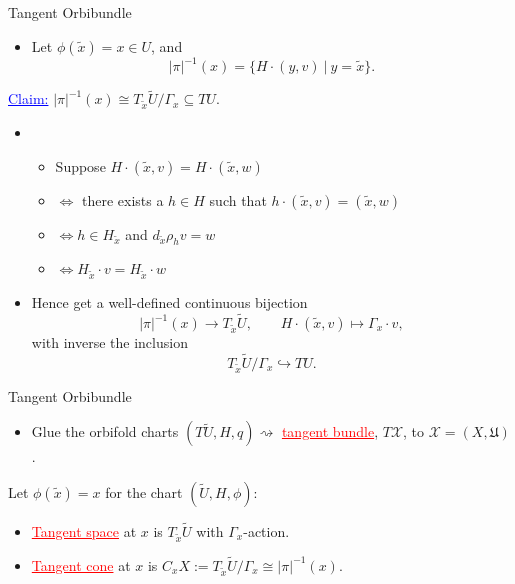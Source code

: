 \documentclass[aspectratio=169,xcolor=dvipsnames]{beamer}
\begin{document}
\begin{frame}{Tangent Orbibundle}
	\begin{itemize}
		\item Let $\phi(\tilde{x}) = x \in U$, and 
		\[
		|\pi|^{-1}(x) = \{ H \cdot (y,v)\ |\ y = \tilde{x} \}.
		\]
	\end{itemize}
	\textcolor{blue}{\underline{Claim:}} $|\pi|^{-1}(x) \cong T_{\tilde{x}}\widetilde{U}/\Gamma_{x} \subseteq TU$.
	\begin{itemize}
		\item
		\begin{itemize}
			\item Suppose $H \cdot (\tilde{x},v) = H \cdot (\tilde{x}, w)$
			\item $\iff$ there exists a $h \in H$ such that $h \cdot (\tilde{x},v) = (\tilde{x},w)$
			\item $\iff h \in H_{\tilde{x}}$ and $d_{\tilde{x}}\rho_{h} v = w$
			\item $\iff H_{\tilde{x}} \cdot v = H_{\tilde{x}} \cdot w$
		\end{itemize}
		\item Hence get a well-defined continuous bijection
		\[
		|\pi|^{-1}(x) \rightarrow T_{\tilde{x}}\widetilde{U}, \qquad H \cdot (\tilde{x}, v) \mapsto \Gamma_{x} \cdot v,
		\]
		with inverse the inclusion
		\[
		T_{\tilde{x}}\widetilde{U}/\Gamma_{x} \hookrightarrow TU.    
		\]
	\end{itemize}
\end{frame}

\begin{frame}{Tangent Orbibundle}
	\begin{itemize}
		\item Glue the orbifold charts $(T\widetilde{U}, H, q) \rightsquigarrow$ \textcolor{red}{\underline{tangent bundle}}, $T\mathcal{X}$, to $\mathcal{X} = (X, \mathfrak{U})$.
	\end{itemize}
	Let $\phi(\tilde{x}) = x$ for the chart $(\widetilde{U}, H, \phi)$:
	\begin{itemize}
		\item \textcolor{red}{\underline{Tangent space}} at $x$ is $T_{\tilde{x}}\widetilde{U}$ with $\Gamma_{x}$-action.
		\item \textcolor{red}{\underline{Tangent cone}} at $x$ is $C_{x}X := T_{\tilde{x}}\widetilde{U}/\Gamma_{x} \cong |\pi|^{-1}(x)$.
	\end{itemize}
\end{frame}
\end{document}
